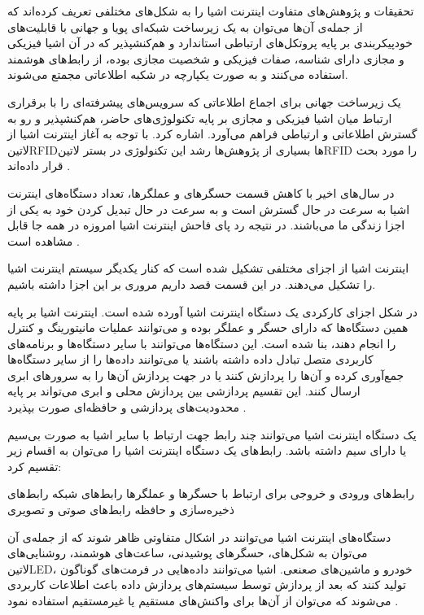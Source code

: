 تحقیقات و پژوهش‌های متفاوت اینترنت اشیا را به شکل‌های مختلفی تعریف کرده‌اند که از جمله‌ی آن‌ها می‌توان به
یک زیرساخت شبکه‌ای پویا و جهانی با قابلیت‌های خودپیکربندی بر پایه پروتکل‌های ارتباطی استاندارد و هم‌کنشپذیر که در آن اشیا فیزیکی و مجازی دارای شناسه، صفات فیزیکی
و شخصیت مجازی بوده، از رابط‌های هوشمند استفاده می‌کنند و به صورت یکپارچه در شکبه اطلاعاتی مجمتع می‌شوند.

یک زیرساخت جهانی برای اجماع اطلاعاتی که سرویس‌های پیشرفته‌ای را با برقراری ارتباط میان اشیا فیزیکی و مجازی بر پایه تکنولوژی‌های حاضر، هم‌کنشپذیر و رو به گسترش اطلاعاتی
و ارتباطی فراهم می‌آورد.
اشاره کرد. با توجه به آغاز اینترنت اشیا از ‌لاتین{RFID}ها بسیاری از پژوهش‌ها رشد این تکنولوژی در بستر ‌لاتین{RFID} را مورد بحث قرار داده‌اند
.

در سال‌های اخیر با کاهش قسمت حسگرهای و عملگرها، تعداد دستگاه‌های اینترنت اشیا به سرعت در حال گسترش است و به سرعت در حال تبدیل کردن خود به یکی از اجزا زندگی ما می‌باشند.
در نتیجه رد پای فاحش اینترنت اشیا امروزه در همه جا قابل مشاهده است
.


اینترنت اشیا از اجزای مختلفی تشکیل شده است که کنار یکدیگر سیستم اینترنت اشیا را تشکیل می‌دهند. در این قسمت قصد داریم مروری بر این اجزا داشته باشیم.

در شکل  اجزای کارکردی یک دستگاه اینترنت اشیا آورده شده است.
اینترنت اشیا بر پایه همین دستگاه‌ها که دارای حسگر و عملگر بوده و می‌توانند عملیات مانیتورینگ و کنترل را انجام دهند، بنا شده است.
این دستگاه‌ها می‌توانند با سایر دستگاه‌ها و برنامه‌های کاربردی متصل تبادل داده داشته باشند یا می‌توانند داده‌ها را از سایر دستگاه‌ها جمع‌آوری کرده
و آن‌ها را پردازش کنند یا در جهت پردازش آن‌ها را به سرورهای ابری ارسال کنند. این تقسیم پردازشی بین پردازش محلی و ابری می‌تواند بر پایه محدودیت‌های پردازشی و حافظه‌ای
صورت بپذیرد
.

یک دستگاه اینترنت اشیا می‌توانند چند رابط جهت ارتباط با سایر اشیا به صورت بی‌سیم یا دارای سیم داشته باشد.
رابط‌های یک دستگاه اینترنت اشیا را می‌توان به اقسام زیر تقسیم کرد:

 رابط‌های ورودی و خروجی برای ارتباط با حسگرها و عملگرها
 رابط‌های شبکه
 رابط‌های ذخیره‌سازی و حافظه
 رابط‌های صوتی و تصویری

دستگاه‌های اینترنت اشیا می‌توانند در اشکال متفاوتی ظاهر شوند که از جمله‌ی آن می‌توان به شکل‌های، حسگرهای پوشیدنی، ساعت‌های هوشمند،
روشنایی‌های ‌لاتین{LED}، خودرو و ماشین‌های صعنعی. اشیا می‌توانند داده‌هایی در فرمت‌های گوناگون تولید کنند که بعد از پردازش توسط سیستم‌های
پردازش داده باعث اطلاعات کاربردی می‌شوند که می‌توان از آن‌ها برای واکنش‌های مستقیم یا غیرمستقیم استفاده نمود
.

